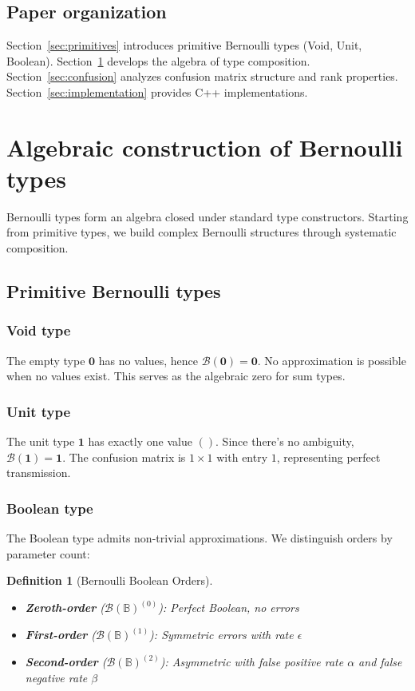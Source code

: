\documentclass[11pt,final,hidelinks]{article}
\newcommand{\FPR}{\alpha}          %
\newcommand{\FNR}{\beta}           %
\newcommand{\Void}{\mathbf{0}}     %
\newcommand{\Unit}{\mathbf{1}}     %
\newcommand{\Bool}{\mathbb{B}}     %
\newcommand{\Ber}[1]{\mathcal{B}(#1)}  %
\theoremstyle{plain}
\newtheorem{definition}{Definition}[section]
\begin{document}
\subsection{Paper organization}

Section~\ref{sec:primitives} introduces primitive Bernoulli types (Void, Unit, Boolean). Section~\ref{sec:algebraic} develops the algebra of type composition. Section~\ref{sec:confusion} analyzes confusion matrix structure and rank properties. Section~\ref{sec:implementation} provides C++ implementations.

\section{Algebraic construction of Bernoulli types}
\label{sec:algebraic}

Bernoulli types form an algebra closed under standard type constructors. Starting from primitive types, we build complex Bernoulli structures through systematic composition.

\subsection{Primitive Bernoulli types}

\subsubsection{Void type}
The empty type $\Void$ has no values, hence $\Ber{\Void} = \Void$. No approximation is possible when no values exist. This serves as the algebraic zero for sum types.

\subsubsection{Unit type}
The unit type $\Unit$ has exactly one value $()$. Since there's no ambiguity, $\Ber{\Unit} = \Unit$. The confusion matrix is $1 \times 1$ with entry $1$, representing perfect transmission.

\subsubsection{Boolean type}
The Boolean type admits non-trivial approximations. We distinguish orders by parameter count:

\begin{definition}[Bernoulli Boolean Orders]
\begin{itemize}
\item \textbf{Zeroth-order} ($\Ber{\Bool}^{(0)}$): Perfect Boolean, no errors
\item \textbf{First-order} ($\Ber{\Bool}^{(1)}$): Symmetric errors with rate $\epsilon$
\item \textbf{Second-order} ($\Ber{\Bool}^{(2)}$): Asymmetric with false positive rate $\FPR$ and false negative rate $\FNR$
\end{itemize}
\end{definition}
\end{document}
